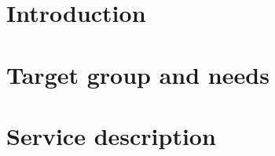 \documentclass[a4paper,twoside]{report}
\begin{document}
\newcommand{\addTwoImages}[2]{
\begin{tabular}{l l}
    \begin{minipage}{0.5\textwidth}
        \texttt{[image: \#1]} 
    \end{minipage}
& 
    \begin{minipage}{0.5\textwidth}
        \texttt{[image: \#1]} 
    \end{minipage}
\\ 
\end{tabular}
}

\newcommand{\addFourImages}[4]{
\begin{tabular}{l l}
    \begin{minipage}{0.5\textwidth}
        \texttt{[image: \#1]} 
    \end{minipage}
& 
    \begin{minipage}{0.5\textwidth}
        \texttt{[image: \#1]} 
    \end{minipage}
\\ 
    \begin{minipage}{0.5\textwidth}
        \texttt{[image: \#3]} 
    \end{minipage}
&
    \begin{minipage}{0.5\textwidth}
        \texttt{[image: \#4]} 
    \end{minipage}
\\
\end{tabular}
}

\setcounter{secnumdepth}{5}

\setlength{\parindent}{0pt}
\setlength{\parskip}{10pt}

\graphicspath{ {figures/} }

\tableofcontents

\chapter{Introduction}


\chapter{Target group and needs}


\chapter{Service description}

\end{document}
